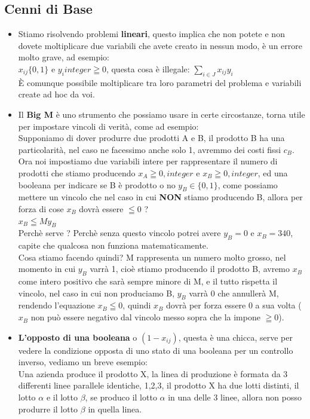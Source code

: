 \documentclass{article}
\begin{document}
\subsection{Cenni di Base}
\begin{itemize}
\item  Stiamo risolvendo problemi \textbf{lineari}, questo implica che non potete e non dovete moltiplicare due variabili che avete creato in nessun modo, è un errore molto grave, ad esempio:\\
$x_{ij} \{0,1\} $ e $y_i integer \geqq 0$, questa cosa è illegale: $\displaystyle \sum_{i \in J} x_{ij}y_i$\\
È comunque possibile moltiplicare tra loro parametri del problema e variabili create ad hoc da voi.
\item Il \textbf{Big M} è uno strumento che possiamo usare in certe circostanze, torna utile per impostare vincoli di verità, come ad esempio:\\
Supponiamo di dover produrre due prodotti A e B, il prodotto B ha una particolarità, nel caso ne facessimo anche solo 1, avremmo dei costi fissi $c_B$.\\
Ora noi impostiamo due variabili intere per rappresentare il numero di prodotti che stiamo producendo $x_A \geqq 0, integer$ e $x_B \geqq 0, integer$, ed una booleana per indicare se B è prodotto o no $y_B \in \{0,1\}$, come possiamo mettere un vincolo che nel caso in cui \textbf{NON} stiamo producendo B, allora per forza di cose $x_B$ dovrà essere $\leqq 0$ ?\\
$x_B \leqq My_B$\\
Perchè serve ? Perchè senza questo vincolo potrei avere $y_B=0$ e $x_B = 340 $, capite che qualcosa non funziona matematicamente.\\
Cosa stiamo facendo quindi? M rappresenta un numero molto grosso, nel momento in cui $y_B$ varrà 1, cioè stiamo producendo il prodotto B, avremo $x_B$ come intero positivo che sarà sempre minore di M, e il tutto rispetta il vincolo, nel caso in cui non produciamo B, $y_B$ varrà 0 che annullerà M, rendendo l'equazione $x_B \leqq 0$, quindi $x_B$ dovrà per forza essere 0 a sua volta ($x_B$ non può essere negativo dal vincolo messo sopra che la impone $\geqq 0$).
\item \textbf{L'opposto di una booleana} o \textbf{$(1-x_{ij})$}, questa è una chicca, serve per vedere la condizione opposta di uno stato di una booleana per un controllo inverso, vediamo un breve esempio:\\
Una azienda produce il prodotto X, la linea di produzione è formata da 3 differenti linee parallele identiche, 1,2,3, il prodotto X ha due lotti distinti, il lotto $\alpha$ e il lotto $\beta$, se produco il lotto $\alpha$ in una delle 3 linee, allora non posso produrre il lotto $\beta$ in quella linea.\\

\end{itemize}
\end{document}
